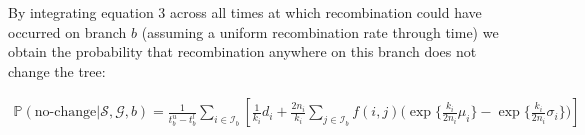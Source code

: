 \documentclass[11pt]{article}
\begin{document}



\noindent By integrating equation 3 across all times at which recombination could
have occurred on branch $b$ (assuming a uniform recombination rate through time) 
we obtain the probability that recombination anywhere on this branch does not 
change the tree:


\begin{equation}
\begin{aligned}
	\mathbb{P}(\textrm{no-change} | \mathcal{S},\mathcal{G},b) = 
	\frac{1}{t_b^u - t_b^l}
	\sum_{i \in \mathcal{I}_b} \left[\frac{1}{k_i} d_i + 
	\frac{2n_i}{k_i} 
	\sum_{j \in \mathcal{I}_b}f(i,j)
	\bigg(
		\exp\bigg\{\frac{k_i}{2n_i}\mu_i \bigg\} - 
		\exp\bigg\{\frac{k_i}{2n_i}\sigma_i \bigg\}
	\bigg)\right]
\end{aligned}
\end{equation}
\end{document}
